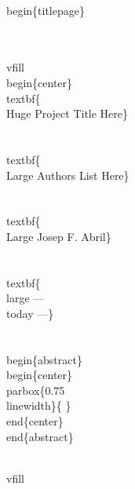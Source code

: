 \documentclass[11pt]{article}
\begin{document}
\\begin\{titlepage\}

\\ \\vfill
\\begin\{center\}
\\textbf\{\\Huge Project Title Here\}\\\\[5ex]

\\textbf\{\\Large Authors List Here\}\\\\[1ex]
\\textbf\{\\Large Josep F. Abril\}\\\\[5ex] %

\\textbf\{\\large --- \\today ---\}\\\\[10ex]

\\begin\{abstract\}
\\begin\{center\}
\\parbox\{0.75\\linewidth\}\{
\} %
\\end\{center\}
\\end\{abstract\}

\\vfill
\end{document}
